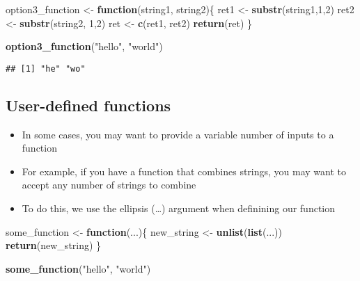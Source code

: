 \documentclass[]{article}
\newenvironment{Shaded}{\begin{snugshade}}{\end{snugshade}}
\newcommand{\KeywordTok}[1]{\textcolor[rgb]{0.13,0.29,0.53}{\textbf{#1}}}
\newcommand{\DecValTok}[1]{\textcolor[rgb]{0.00,0.00,0.81}{#1}}
\newcommand{\StringTok}[1]{\textcolor[rgb]{0.31,0.60,0.02}{#1}}
\newcommand{\ControlFlowTok}[1]{\textcolor[rgb]{0.13,0.29,0.53}{\textbf{#1}}}
\newcommand{\NormalTok}[1]{#1}
\providecommand{\tightlist}{%
  \setlength{\itemsep}{0pt}\setlength{\parskip}{0pt}}
\begin{document}
\begin{Shaded}
\begin{Highlighting}[]
\NormalTok{option3_function <-}\StringTok{ }\ControlFlowTok{function}\NormalTok{(string1, string2)\{}
\NormalTok{  ret1 <-}\StringTok{ }\KeywordTok{substr}\NormalTok{(string1,}\DecValTok{1}\NormalTok{,}\DecValTok{2}\NormalTok{)}
\NormalTok{  ret2 <-}\StringTok{ }\KeywordTok{substr}\NormalTok{(string2, }\DecValTok{1}\NormalTok{,}\DecValTok{2}\NormalTok{)}
\NormalTok{  ret <-}\StringTok{ }\KeywordTok{c}\NormalTok{(ret1, ret2)}
  \KeywordTok{return}\NormalTok{(ret)}
\NormalTok{\}}

\KeywordTok{option3_function}\NormalTok{(}\StringTok{"hello"}\NormalTok{, }\StringTok{"world"}\NormalTok{)}
\end{Highlighting}
\end{Shaded}

\begin{verbatim}
## [1] "he" "wo"
\end{verbatim}

\subsection{User-defined functions}\label{user-defined-functions}

\begin{itemize}
\tightlist
\item
  In some cases, you may want to provide a variable number of inputs to
  a function
\item
  For example, if you have a function that combines strings, you may
  want to accept any number of strings to combine
\item
  To do this, we use the ellipsis (\ldots{}) argument when definining
  our function
\end{itemize}

\begin{Shaded}
\begin{Highlighting}[]
\NormalTok{some_function <-}\StringTok{ }\ControlFlowTok{function}\NormalTok{(...)\{}
\NormalTok{  new_string <-}\StringTok{ }\KeywordTok{unlist}\NormalTok{(}\KeywordTok{list}\NormalTok{(...))}
  \KeywordTok{return}\NormalTok{(new_string)}
\NormalTok{\}}

\KeywordTok{some_function}\NormalTok{(}\StringTok{"hello"}\NormalTok{, }\StringTok{"world"}\NormalTok{)}
\end{Highlighting}
\end{Shaded}
\end{document}
